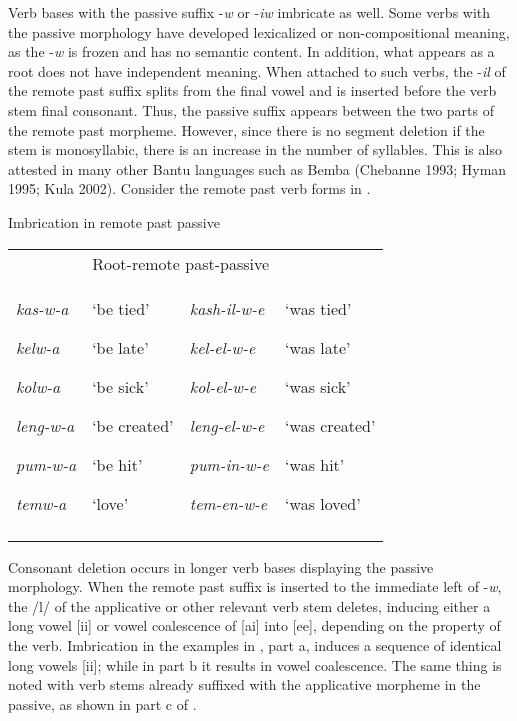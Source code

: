 \documentclass[output=paper]{langsci/langscibook}
\begin{document}
Verb bases with the passive suffix -\emph{w} or -\emph{iw }imbricate as well. Some verbs with the passive morphology have developed lexicalized or non-compositional meaning, as the -\emph{w} is frozen and has no semantic content. In addition, what appears as a root does not have independent meaning. When attached to such verbs, the -\emph{il} of the remote past suffix splits from the final vowel and is inserted before the verb stem final consonant. Thus, the passive suffix appears between the two parts of the remote past morpheme. However, since there is no segment deletion if the stem is monosyllabic, there is an increase in the number of syllables. This is also attested in many other Bantu languages such as Bemba (Chebanne 1993; Hyman 1995; Kula 2002). Consider the remote past verb forms in .


\begin{table}
\caption{Imbrication in remote past passive}
\label{tab:25}
\end{table}

\begin{tabularx}{\textwidth}{XXXX}
\lsptoprule
\multicolumn{2}{l}{Root-passive-FV} & \multicolumn{2}{l}{Root-remote past-passive}\\
{\emph{kas-w-a}}

{\emph{kelw-a}}

{\emph{kolw-a}}

{\emph{leng-w-a}}

{\emph{pum-w-a}}

\emph{temw-a  } & {‘be tied’}

{‘be late’}

{‘be sick’}

{‘be created’}

{‘be hit’}

‘love’ & {\emph{kash-il-w-e}}

{\emph{kel-el-w-e}}

{\emph{kol-el-w-e}}

{\emph{leng-el-w-e}}

{\emph{pum-in-w-e}}

\emph{tem-en-w-e} & {‘was tied’}

{‘was late’}

{‘was sick’}

{‘was created’}

{‘was hit’}

‘was loved’\\
\lspbottomrule
\end{tabularx}
Consonant deletion occurs in longer verb bases displaying the passive morphology. When the remote past suffix is inserted to the immediate left of -\textit{w}, the /l/ of the applicative or other relevant verb stem deletes, inducing either a long vowel [ii] or vowel coalescence of [ai] into [ee], depending on the property of the verb. Imbrication in the examples in , part a, induces a sequence of identical long vowels [ii]; while in part b it results in vowel coalescence. The same thing is noted with verb stems already suffixed with the applicative morpheme in the passive, as shown in part c of .
\end{document}
